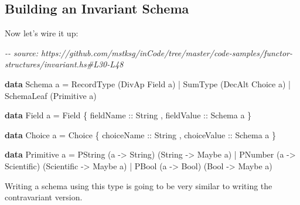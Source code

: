 \documentclass[]{article}
\newenvironment{Shaded}{}{}
\newcommand{\CommentTok}[1]{\textcolor[rgb]{0.38,0.63,0.69}{\textit{#1}}}
\newcommand{\DataTypeTok}[1]{\textcolor[rgb]{0.56,0.13,0.00}{#1}}
\newcommand{\KeywordTok}[1]{\textcolor[rgb]{0.00,0.44,0.13}{\textbf{#1}}}
\newcommand{\NormalTok}[1]{#1}
\newcommand{\OperatorTok}[1]{\textcolor[rgb]{0.40,0.40,0.40}{#1}}
\newcommand{\OtherTok}[1]{\textcolor[rgb]{0.00,0.44,0.13}{#1}}
\begin{document}
\hypertarget{building-an-invariant-schema}{%
\subsection{Building an Invariant Schema}\label{building-an-invariant-schema}}

Now let's wire it up:

\begin{Shaded}
\begin{Highlighting}[]
\CommentTok{{-}{-} source: https://github.com/mstksg/inCode/tree/master/code{-}samples/functor{-}structures/invariant.hs\#L30{-}L48}

\KeywordTok{data} \DataTypeTok{Schema}\NormalTok{ a }\OtherTok{=}
      \DataTypeTok{RecordType}\NormalTok{  (}\DataTypeTok{DivAp}   \DataTypeTok{Field}\NormalTok{  a)}
    \OperatorTok{|} \DataTypeTok{SumType}\NormalTok{     (}\DataTypeTok{DecAlt} \DataTypeTok{Choice}\NormalTok{ a)}
    \OperatorTok{|} \DataTypeTok{SchemaLeaf}\NormalTok{  (}\DataTypeTok{Primitive}\NormalTok{ a)}

\KeywordTok{data} \DataTypeTok{Field}\NormalTok{ a }\OtherTok{=} \DataTypeTok{Field}
\NormalTok{    \{}\OtherTok{ fieldName  ::} \DataTypeTok{String}
\NormalTok{    ,}\OtherTok{ fieldValue ::} \DataTypeTok{Schema}\NormalTok{ a}
\NormalTok{    \}}

\KeywordTok{data} \DataTypeTok{Choice}\NormalTok{ a }\OtherTok{=} \DataTypeTok{Choice}
\NormalTok{    \{}\OtherTok{ choiceName  ::} \DataTypeTok{String}
\NormalTok{    ,}\OtherTok{ choiceValue ::} \DataTypeTok{Schema}\NormalTok{ a}
\NormalTok{    \}}

\KeywordTok{data} \DataTypeTok{Primitive}\NormalTok{ a }\OtherTok{=}
      \DataTypeTok{PString}\NormalTok{ (a }\OtherTok{{-}>} \DataTypeTok{String}\NormalTok{)     (}\DataTypeTok{String}     \OtherTok{{-}>} \DataTypeTok{Maybe}\NormalTok{ a)}
    \OperatorTok{|} \DataTypeTok{PNumber}\NormalTok{ (a }\OtherTok{{-}>} \DataTypeTok{Scientific}\NormalTok{) (}\DataTypeTok{Scientific} \OtherTok{{-}>} \DataTypeTok{Maybe}\NormalTok{ a)}
    \OperatorTok{|} \DataTypeTok{PBool}\NormalTok{   (a }\OtherTok{{-}>} \DataTypeTok{Bool}\NormalTok{)       (}\DataTypeTok{Bool}       \OtherTok{{-}>} \DataTypeTok{Maybe}\NormalTok{ a)}
\end{Highlighting}
\end{Shaded}

Writing a schema using this type is going to be very similar to writing the
contravariant version.
\end{document}
